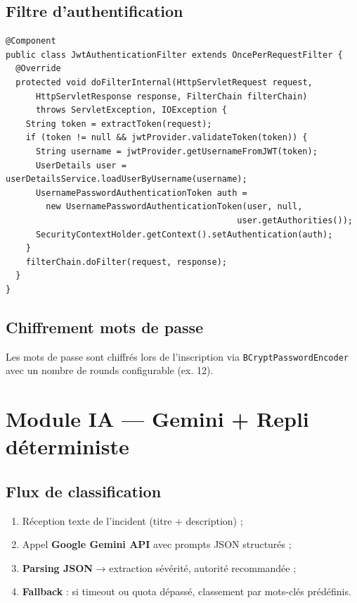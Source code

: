 \documentclass[12pt,a4paper,twoside,openright]{book}
\begin{document}
\subsection{Filtre d'authentification}
\begin{lstlisting}[style=javaurban,caption={JwtAuthenticationFilter — valide JWT à chaque requête.},label=lst:jwt_filter]
@Component
public class JwtAuthenticationFilter extends OncePerRequestFilter {
  @Override
  protected void doFilterInternal(HttpServletRequest request,
      HttpServletResponse response, FilterChain filterChain)
      throws ServletException, IOException {
    String token = extractToken(request);
    if (token != null && jwtProvider.validateToken(token)) {
      String username = jwtProvider.getUsernameFromJWT(token);
      UserDetails user = userDetailsService.loadUserByUsername(username);
      UsernamePasswordAuthenticationToken auth =
        new UsernamePasswordAuthenticationToken(user, null,
                                              user.getAuthorities());
      SecurityContextHolder.getContext().setAuthentication(auth);
    }
    filterChain.doFilter(request, response);
  }
}
\end{lstlisting}

\subsection{Chiffrement mots de passe}
Les mots de passe sont chiffrés lors de l'inscription via \texttt{BCryptPasswordEncoder} avec un nombre de rounds configurable (ex. 12).

\section{Module IA — Gemini + Repli déterministe}

\subsection{Flux de classification}
\begin{enumerate}
  \item Réception texte de l'incident (titre + description) ;
  \item Appel \textbf{Google Gemini API} avec prompts JSON structurés ;
  \item \textbf{Parsing JSON} → extraction sévérité, autorité recommandée ;
  \item \textbf{Fallback} : si timeout ou quota dépassé, classement par mots-clés prédéfinis.
\end{enumerate}
\end{document}
